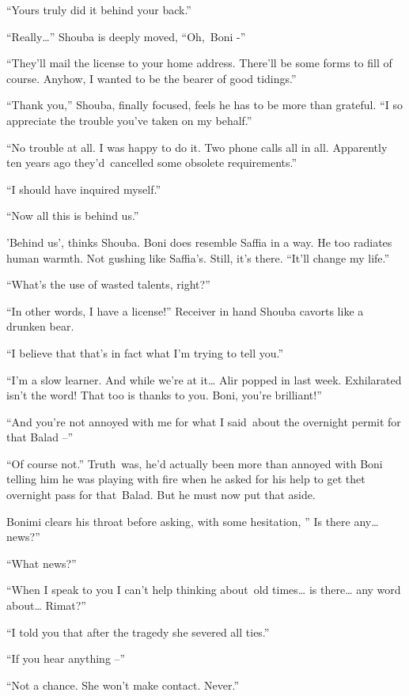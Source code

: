 \documentclass[twoside,11pt]{book}
\begin{document}
``Yours truly did it behind your back.'' 

``Really{\dots}'' Shouba is deeply moved, ``Oh,~Boni -'' 

``They'll mail the license to your home address. There'll be some forms to fill of course. Anyhow, I wanted
to be the bearer of good tidings.'' 

``Thank you,'' Shouba, finally focused, feels he has to be more than grateful.
``I so appreciate the trouble you've taken on my behalf.'' 

``No trouble at all. I was happy to do it. Two phone calls all in all. Apparently ten years ago
they{}'d\ cancelled some obsolete requirements.'' 

``I should have inquired myself.'' 

``Now all this is behind us.'' 

{}'Behind us', thinks Shouba. Boni does resemble Saffia in a way. He too radiates human warmth. Not gushing like
Saffia{}'s. Still, it's there. ``It'll change my life.'' 

``What's the use of wasted talents, right?'' 

``In other words, I have a license!'' Receiver in hand Shouba cavorts like a drunken bear. 

``I believe that that's in fact what I'm trying to tell you.'' 

``I'm a slow learner. And while we're at it{\dots} Alir popped in last week. Exhilarated isn't the word!
That too is thanks to you. Boni, you're brilliant!'' 

``And you're not annoyed with me for what I said~about the overnight permit for that Balad
--'' 

``Of course not.'' Truth{\ }was, he'd actually been more than annoyed with Boni
telling him he was playing with fire when he asked for his help to get thet overnight pass for
that{\ }Balad. But he must now put that aside. 

Bonimi clears his throat before asking, with some hesitation, '' Is there any{\dots} news?'' 

``What news?'' 

``When I speak to you I can't help thinking about~old times{\dots} is there{\dots} any word about{\dots}
Rimat?'' 

``I told you that after the tragedy she severed all ties.'' 

``If you hear anything --'' 

``Not a chance. She won't make contact. Never.'' 
\end{document}
